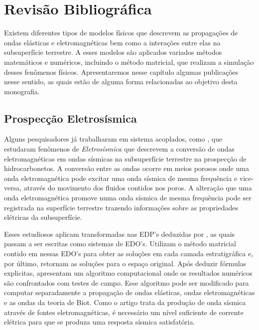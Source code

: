 \chapter{Revis\~ao Bibliogr\'afica}

Existem diferentes tipos de modelos f\'isicos que descrevem as propaga\c{c}\~oes de ondas el\'asticas e eletromagn\'eticas bem como a intera\c{c}\~oes entre elas na subsuperf\'icie terrestre. A esses modelos s\~ao aplicados variados m\'etodos matem\'aticos e num\'ericos, incluindo o m\'etodo matricial, que realizam a simula\c{c}\~ao desses fen\^omenos f\'isicos. Apresentaremos nesse cap\'itulo algumas publica\c{c}\~oes nesse sentido, as quais est\~ao de alguma forma relacionadas ao objetivo desta monografia. 

\section{Prospec\c{c}\~ao Eletros\'ismica}

Alguns pesquisadores j\'a trabalharam em sistema acoplados, como \cite{White_Zhou_2006}, que estudaram fen\^omenos de \textit{Eletros\'ismica} que descrevem a convers\~ao de ondas eletromagn\'eticas em ondas s\'ismicas na subsuperf\'icie terrestre na prospec\c{c}\~ao de hidrocarbonetos. A convers\~ao entre as ondas ocorre em meios porosos onde uma onda eletromagn\'etica pode excitar uma onda s\'ismica de mesma frequ\^encia e vice-versa, atrav\'es do movimento dos fluidos contidos nos poros. A altera\c{c}\~ao que uma onda eletromagn\'etica promove numa onda s\'ismica de mesma frequ\^encia pode ser registrada na superf\'icie terrestre trazendo informa\c{c}\~oes sobre as propriedades el\'etricas da subsuperf\'icie. 


Esses estudiosos aplicam transformadas nas EDP's deduzidas por \cite{pride_94}, as quais passam a ser escritas como sistemas de EDO's. Utilizam o m\'etodo matricial contido em \cite{Ursin-1983} nessas EDO's para obter as solu\c{c}\~oes em cada camada estratigr\'afica e, por \'ultimo, retornam as solu\c{c}\~oes para o espa\c{c}o original. Ap\'os deduzir f\'ormulas explicitas, apresentam um algoritmo computacional onde os resultados num\'ericos s\~ao confrontados com testes de campo. Esse algoritmo pode ser modificado para computar separadamente a propaga\c{c}\~ao de ondas el\'asticas, ondas eletromagn\'eticas e as ondas da teoria de Biot. Como o artigo trata da produ\c{c}\~ao de onda s\'ismica atrav\'es de fontes eletromagn\'eticas, \'e necess\'ario um n\'ivel suficiente de corrente el\'etrica para que se produza uma resposta s\'ismica satisfat\'oria. 


